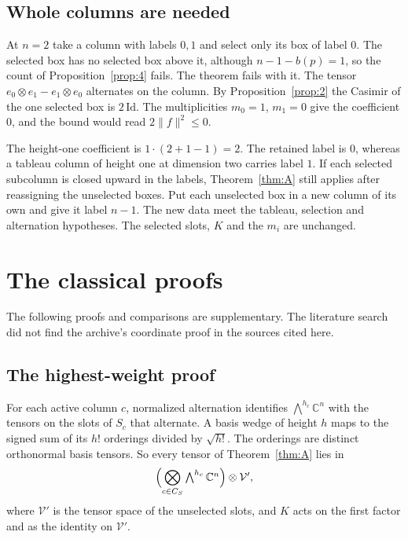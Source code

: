 \documentclass[11pt]{amsart}
\newcommand{\notlean}{supplementary}
\theoremstyle{definition}
\theoremstyle{remark}
\begin{document}
\subsection{Whole columns are needed}

At \(n=2\) take a column with labels \(0,1\) and select only its box of label
\(0\). The selected box has no selected box above it, although
\(n-1-b(p)=1\), so the count of Proposition~\ref{prop:4} fails. The theorem
fails with it. The tensor \(e_0\otimes e_1-e_1\otimes e_0\) alternates on the
column. By Proposition~\ref{prop:2} the Casimir of the one selected box is
\(2\,\mathrm{Id}\). The multiplicities \(m_0=1\), \(m_1=0\) give the
coefficient \(0\), and the bound would read \(2\|f\|^2\le0\).

The height-one coefficient is \(1\cdot(2+1-1)=2\). The retained label
is \(0\), whereas a tableau column of height one at dimension two carries
label \(1\). If each selected subcolumn is closed upward in the labels,
Theorem~\ref{thm:A} still applies after reassigning the unselected boxes.
Put each unselected box in a new column of its own and give it label
\(n-1\). The new data meet the tableau, selection and alternation
hypotheses. The selected slots, \(K\) and the \(m_i\) are unchanged.

\section{The classical proofs}\label{sec:classical}

The following proofs and comparisons are \notlean. The literature
search did not find the archive's coordinate proof in the sources cited
here.

\subsection{The highest-weight proof}\label{sec:hw}

For each active column \(c\), normalized alternation
identifies \(\bigwedge^{h_c}\mathbb C^n\) with the tensors on the slots of
\(S_c\) that alternate. A basis wedge of height \(h\) maps to the signed sum
of its \(h!\) orderings divided by \(\sqrt{h!}\). The orderings are distinct
orthonormal basis tensors. So every tensor of Theorem~\ref{thm:A} lies in
\[
\Bigl(\bigotimes_{c\in C_S}\textstyle\bigwedge^{h_c}\mathbb C^n\Bigr)\otimes\mathcal V',
\]
where \(\mathcal V'\) is the tensor space of the unselected slots, and \(K\)
acts on the first factor and as the identity on \(\mathcal V'\).
\end{document}
